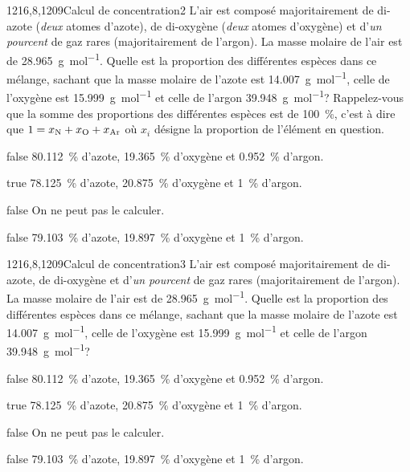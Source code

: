 \documentclass[11pt]{article}
\begin{document}
		\begin{question}{1216,8,1209}{Calcul de concentration}{2}{}
            L'air est composé majoritairement de di-azote (\emph{deux} atomes d'azote), de di-oxygène (\emph{deux} atomes d'oxygène) et d'\emph{un pourcent} de gaz rares (majoritairement de l'argon). La masse molaire de l'air est de \SI{28.965}{\gram\per\mol}. Quelle est la proportion des différentes espèces dans ce mélange, sachant que la masse molaire de l'azote est \SI{14.007}{\gram\per\mol}, celle de l'oxygène est \SI{15.999}{\gram\per\mol} et celle de l'argon \SI{39.948}{\gram\per\mol}? Rappelez-vous que la somme des proportions des différentes espèces est de \SI{100}{\percent}, c'est à dire que $1 = x_{\ce{N}} + x_{\ce{O}} + x_{\ce{Ar}}$ où $x_i$ désigne la proportion de l'élément en question.
        \end{question}
        \begin{reponses}
            \item[false] \SI{80.112}{\percent} d'azote, \SI{19.365}{\percent} d'oxygène et \SI{0.952}{\percent} d'argon.
		    \item[true] \SI{78.125}{\percent} d'azote, \SI{20.875}{\percent} d'oxygène et \SI{1}{\percent} d'argon.
		    \item[false] On ne peut pas le calculer.
		    \item[false] \SI{79.103}{\percent} d'azote, \SI{19.897}{\percent} d'oxygène et \SI{1}{\percent} d'argon.
        \end{reponses}
		
		\begin{question}{1216,8,1209}{Calcul de concentration}{3}{}
            L'air est composé majoritairement de di-azote, de di-oxygène et d'\emph{un pourcent} de gaz rares (majoritairement de l'argon). La masse molaire de l'air est de \SI{28.965}{\gram\per\mol}. Quelle est la proportion des différentes espèces dans ce mélange, sachant que la masse molaire de l'azote est \SI{14.007}{\gram\per\mol}, celle de l'oxygène est \SI{15.999}{\gram\per\mol} et celle de l'argon \SI{39.948}{\gram\per\mol}?
        \end{question}
        \begin{reponses}
            \item[false] \SI{80.112}{\percent} d'azote, \SI{19.365}{\percent} d'oxygène et \SI{0.952}{\percent} d'argon.
		    \item[true] \SI{78.125}{\percent} d'azote, \SI{20.875}{\percent} d'oxygène et \SI{1}{\percent} d'argon.
		    \item[false] On ne peut pas le calculer.
		    \item[false] \SI{79.103}{\percent} d'azote, \SI{19.897}{\percent} d'oxygène et \SI{1}{\percent} d'argon.
        \end{reponses}
		
\end{document}
